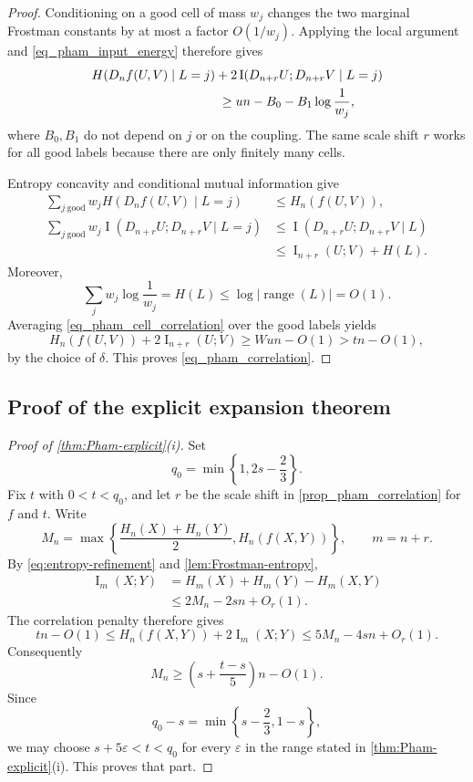 \documentclass[11pt]{article}
\begin{document}
\begin{proof}
Conditioning on a good cell of mass $w_j$ changes the two marginal
Frostman constants by at most a factor $O(1/w_j)$.  Applying the local
argument and \eqref{eq_pham_input_energy} therefore gives
\begin{align}
 &H(D_nf(U,V)\mid L=j)
 +2\operatorname{I}(D_{n+r}U;D_{n+r}V\mid L=j)\notag\\
 &\hspace{35mm}\geq u n-B_0-B_1\log\frac{1}{w_j},
 \label{eq_pham_cell_correlation}
\end{align}
where $B_0,B_1$ do not depend on $j$ or on the coupling.  The same
scale shift $r$ works for all good labels because there are only
finitely many cells.

Entropy concavity and conditional mutual information give
\begin{align*}
 \sum_{j\ \mathrm{good}}w_jH(D_nf(U,V)\mid L=j)
 &\leq H_n(f(U,V)),\\
 \sum_{j\ \mathrm{good}}w_j
 \operatorname{I}(D_{n+r}U;D_{n+r}V\mid L=j)
 &\leq\operatorname{I}(D_{n+r}U;D_{n+r}V\mid L)\\
 &\leq\operatorname{I}_{n+r}(U;V)+H(L).
\end{align*}
Moreover,
\[
 \sum_jw_j\log\frac{1}{w_j}=H(L)\leq\log|\operatorname{range}(L)|=O(1).
\]
Averaging \eqref{eq_pham_cell_correlation} over the good labels yields
\[
 H_n(f(U,V))+2\operatorname{I}_{n+r}(U;V)
 \geq Wu n-O(1)>t n-O(1),
\]
by the choice of $\delta$.  This proves
\eqref{eq_pham_correlation}.
\end{proof}

\subsection{Proof of the explicit expansion theorem}

\begin{proof}[Proof of \cref{thm:Pham-explicit}\textup{(i)}]
Set
\[
 q_0=\min\left\{1,2s-\frac{2}{3}\right\}.
\]
Fix \(t\) with \(0<t<q_0\), and let \(r\) be the scale shift in
\cref{prop_pham_correlation} for \(f\) and \(t\).  Write
\[
 M_n=\max\left\{\frac{H_n(X)+H_n(Y)}{2},H_n(f(X,Y))\right\},
 \qquad m=n+r.
\]
By \eqref{eq:entropy-refinement} and
\cref{lem:Frostman-entropy},
\begin{align*}
 \operatorname{I}_m(X;Y)
 &=H_m(X)+H_m(Y)-H_m(X,Y)\\
 &\le 2M_n-2sn+O_r(1).
\end{align*}
The correlation penalty therefore gives
\[
 t n-O(1)
 \le H_n(f(X,Y))+2\operatorname{I}_m(X;Y)
 \le 5M_n-4sn+O_r(1).
\]
Consequently
\[
 M_n\ge\left(s+\frac{t-s}{5}\right)n-O(1).
\]
Since
\[
 q_0-s=\min\left\{s-\frac{2}{3},1-s\right\},
\]
we may choose \(s+5\varepsilon<t<q_0\) for every \(\varepsilon\) in the range
stated in \cref{thm:Pham-explicit}\textup{(i)}.  This proves that part.
\end{proof}
\end{document}
